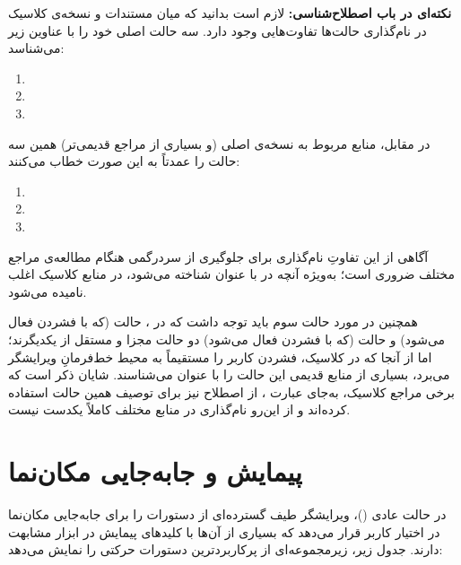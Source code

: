 \begin{note}
\textbf{نکته‌ای در باب اصطلاح‌شناسی:} لازم است بدانید که میان مستندات  و نسخه‌ی کلاسیک  در نام‌گذاری حالت‌ها تفاوت‌هایی وجود دارد.  سه حالت اصلی خود را با عناوین زیر می‌شناسد:
\begin{enumerate}
  \item {}
  \item {}
  \item {}
\end{enumerate}
در مقابل، منابع مربوط به نسخه‌ی اصلی  (و بسیاری از مراجع قدیمی‌تر) همین سه حالت را عمدتاً به این صورت خطاب می‌کنند:
\begin{enumerate}
  \item {}
  \item {}
  \item {}
\end{enumerate}
آگاهی از این تفاوتِ نام‌گذاری برای جلوگیری از سردرگمی هنگام مطالعه‌ی مراجع مختلف ضروری است؛ به‌ویژه آنچه در  با عنوان  شناخته می‌شود، در منابع کلاسیک اغلب  نامیده می‌شود.

همچنین در مورد حالت سوم باید توجه داشت که در ، حالت  (که با فشردن \cmd{:} فعال می‌شود) و حالت  (که با فشردن  فعال می‌شود) دو حالت مجزا و مستقل از یکدیگرند؛ اما از آنجا که در  کلاسیک، فشردن \cmd{:} کاربر را مستقیماً به محیط خط‌فرمانِ ویرایشگر  می‌برد، بسیاری از منابع قدیمی این حالت را با عنوان  می‌شناسند. شایان ذکر است که برخی مراجع کلاسیک، به‌جای عبارت ، از اصطلاح  نیز برای توصیف همین حالت استفاده کرده‌اند و از این‌رو نام‌گذاری در منابع مختلف کاملاً یکدست نیست.
\end{note}

\section{پیمایش و جابه‌جایی مکان‌نما}

در حالت عادی ()، ویرایشگر  طیف گسترده‌ای از دستورات را برای جابه‌جایی مکان‌نما در اختیار کاربر قرار می‌دهد که بسیاری از آن‌ها با کلیدهای پیمایش در ابزار  مشابهت دارند. جدول زیر، زیرمجموعه‌ای از پرکاربردترین دستورات حرکتی را نمایش می‌دهد:

